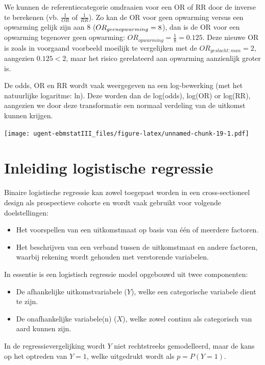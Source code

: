 \documentclass[
]{book}
\providecommand{\tightlist}{%
  \setlength{\itemsep}{0pt}\setlength{\parskip}{0pt}}
\theoremstyle{definition}
\theoremstyle{definition}
\theoremstyle{definition}
\theoremstyle{definition}
\theoremstyle{remark}
\begin{document}
We kunnen de referentiecategorie omdraaien voor een OR of RR door de inverse te berekenen (vb. \(\frac{1}{OR}\) of \(\frac{1}{RR}\)). Zo kan de OR voor geen opwarming versus een opwarming gelijk zijn aan 8 (\(OR_{geen \space opwarming} = 8\)), dan is de OR voor een opwarming tegenover geen opwarming: \(OR_{opwarming} = \frac{1}{8} = 0.125\). Deze nieuwe OR is zoals in voorgaand voorbeeld moeilijk te vergelijken met de \(OR_{geslacht:man} = 2\), aangezien \(0.125 < 2\), maar het risico gerelateerd aan opwarming aanzienlijk groter is.

De odds, OR en RR wordt vaak weergegeven na een log-bewerking (met het natuurlijke logaritme: ln). Deze worden dan de log(odds), log(OR) or log(RR), aangezien we door deze transformatie een normaal verdeling van de uitkomst kunnen krijgen.

\texttt{[image: ugent-ebmstatIII\_files/figure-latex/unnamed-chunk-19-1.pdf]}

\hypertarget{inleiding-logistische-regressie}{%
\section*{Inleiding logistische regressie}\label{inleiding-logistische-regressie}}


Binaire logistische regressie kan zowel toegepast worden in een cross-sectioneel design als prospectieve cohorte en wordt vaak gebruikt voor volgende doelstellingen:

\begin{itemize}
\tightlist
\item
  Het voorspellen van een uitkomstmaat op basis van één of meerdere factoren.
\item
  Het beschrijven van een verband tussen de uitkomstmaat en andere factoren, waarbij rekening wordt gehouden met verstorende variabelen.
\end{itemize}

In essentie is een logistisch regressie model opgebouwd uit twee componenten:

\begin{itemize}
\tightlist
\item
  De afhankelijke uitkomstvariabele (\(Y\)), welke een categorische variabele dient te zijn.
\item
  De onafhankelijke variabele(n) (\(X\)), welke zowel continu als categorisch van aard kunnen zijn.
\end{itemize}

In de regressievergelijking wordt \(Y\) niet rechtstreeks gemodelleerd, maar de kans op het optreden van \(Y = 1\), welke uitgedrukt wordt als \(p = P(Y=1)\).
\end{document}
